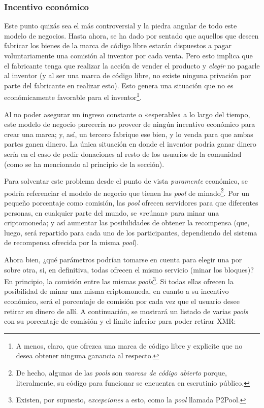 \documentclass[12pt,a4paper]{article}
\begin{document}
\subsubsection{Incentivo económico}
Este punto quizás sea el más controversial y la piedra angular de todo este modelo de negocios. Hasta ahora, se ha dado por sentado que aquellos que deseen fabricar los bienes de la marca de código libre estarán dispuestos a pagar voluntariamente una comisión al inventor por cada venta. Pero esto implica que el fabricante tenga que realizar la acción de vender el producto y \textit{elegir} no pagarle al inventor (y al ser una marca de código libre, no existe ninguna privación por parte del fabricante en realizar esto). Esto genera una situación que no es económicamente favorable para el inventor\footnote{A menos, claro, que ofrezca una marca de código libre y explicite que no desea obtener ninguna ganancia al respecto.}.

Al no poder asegurar un ingreso constante o «esperable» a lo largo del tiempo, este modelo de negocio parecería no proveer de ningún incentivo económico para crear una marca; y, así, un tercero fabrique ese bien, y lo venda para que ambas partes ganen dinero. La única situación en donde el inventor podría ganar dinero sería en el caso de pedir donaciones al resto de los usuarios de la comunidad (como se ha mencionado al principio de la sección).

Para solventar este problema desde el punto de vista \textit{puramente} económico, se podría referenciar el modelo de negocio que tienen las \textit{pool} de minado\footnote{De hecho, algunas de las \textit{pools} son \textit{marcas de código abierto} porque, literalmente, su código para funcionar se encuentra en escrutinio público.}. Por un pequeño porcentaje como comisión, las \textit{pool} ofrecen servidores para que diferentes personas, en cualquier parte del mundo, se «reúnan» para minar una criptomoneda; y así aumentar las posibilidades de obtener la recompensa (que, luego, será repartido para cada uno de los participantes, dependiendo del sistema de recompensa ofrecida por la misma \textit{pool}). 

Ahora bien, ¿qué parámetros podrían tomarse en cuenta para elegir una por sobre otra, si, en definitiva, todas ofrecen el mismo servicio (minar los bloques)? En principio, la comisión entre las mismas \textit{pools}\footnote{Existen, por supuesto, \textit{excepciones} a esto, como la \textit{pool} llamada P2Pool.}. Si todas ellas ofrecen la posibilidad de minar una misma criptomoneda, en cuanto a su incentivo económico, será el porcentaje de comisión por cada vez que el usuario desee retirar su dinero de allí. A continuación, se mostrará un listado de varias \textit{pools} con su porcentaje de comisión y el límite inferior para poder retirar XMR:
\end{document}
